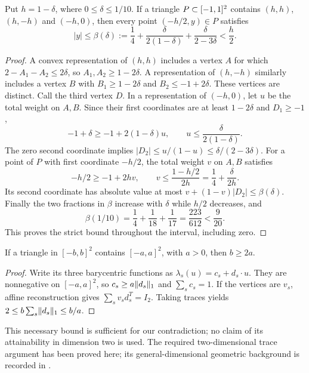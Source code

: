 \begin{lemma}
\label{lem:forced-triangle}
Put $h=1-\delta$, where $0\le\delta\le1/10$. If a triangle
$P\subset[-1,1]^2$ contains $(h,h)$, $(h,-h)$ and $(-h,0)$, then every
point $(-h/2,y)\in P$ satisfies
\begin{equation}\label{eq:beta}
 |y|\le\beta(\delta):=\frac14+\frac{\delta}{2(1-\delta)}
                      +\frac{\delta}{2-3\delta}<\frac h2.
\end{equation}
\end{lemma}
\begin{proof}
A convex representation of $(h,h)$ includes a vertex $A$ for which
$2-A_1-A_2\le2\delta$, so $A_1,A_2\ge1-2\delta$. A representation
of $(h,-h)$ similarly includes a vertex $B$ with
$B_1\ge1-2\delta$ and $B_2\le-1+2\delta$. These vertices are distinct.
Call the third vertex $D$. In a representation of $(-h,0)$, let $u$
be the total weight on $A,B$. Since their first coordinates are at
least $1-2\delta$ and $D_1\ge-1$,
\[
 -1+\delta\ge -1+2(1-\delta)u,
 \qquad u\le\frac{\delta}{2(1-\delta)}.
\]
The zero second coordinate implies
$|D_2|\le u/(1-u)\le\delta/(2-3\delta)$.
For a point of $P$ with first coordinate $-h/2$, the total weight $v$
on $A,B$ satisfies
\[
 -h/2\ge-1+2hv,
 \qquad v\le\frac{1-h/2}{2h}
               =\frac14+\frac{\delta}{2h}.
\]
Its second coordinate has absolute value at most
$v+(1-v)|D_2|\le\beta(\delta)$. Finally the two fractions in
$\beta$ increase with $\delta$ while $h/2$ decreases, and
\[
 \beta(1/10)=\frac14+\frac1{18}+\frac1{17}
             =\frac{223}{612}<\frac9{20}.
\]
This proves the strict bound throughout the interval, including zero.
\end{proof}

\begin{lemma}
\label{lem:square-trace}
If a triangle in $[-b,b]^2$ contains $[-a,a]^2$, with $a>0$, then
$b\ge2a$.
\end{lemma}
\begin{proof}
Write its three barycentric functions as $\lambda_s(u)=c_s+d_s\cdot u$.
They are nonnegative on $[-a,a]^2$, so $c_s\ge a\lVert d_s\rVert_1$ and
$\sum_sc_s=1$. If the vertices are $v_s$, affine reconstruction gives
$\sum_s v_sd_s^T=I_2$. Taking traces yields
$2\le b\sum_s\lVert d_s\rVert_1\le b/a$.
\end{proof}
This necessary bound is sufficient for our contradiction; no claim of
its attainability in dimension two is used. The required two-dimensional trace argument has been proved here;
its general-dimensional geometric background is recorded in \cite{GTF31}.

